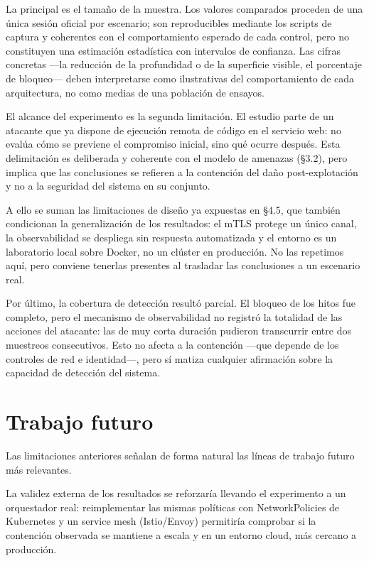 \documentclass[11pt,spanish,listoffigures,listoftables]{tfgetsinf}
\begin{document}
        La principal es el tamaño de la muestra. Los valores comparados proceden de una única sesión oficial por escenario; son reproducibles mediante los scripts de captura y coherentes con el comportamiento esperado de cada control, pero no constituyen una estimación estadística con intervalos de confianza. Las cifras concretas —la reducción de la profundidad o de la superficie visible, el porcentaje de bloqueo— deben interpretarse como ilustrativas del comportamiento de cada arquitectura, no como medias de una población de ensayos.

        El alcance del experimento es la segunda limitación. El estudio parte de un atacante que ya dispone de ejecución remota de código en el servicio web: no evalúa cómo se previene el compromiso inicial, sino qué ocurre después. Esta delimitación es deliberada y coherente con el modelo de amenazas (§3.2), pero implica que las conclusiones se refieren a la contención del daño post-explotación y no a la seguridad del sistema en su conjunto.

        A ello se suman las limitaciones de diseño ya expuestas en §4.5, que también condicionan la generalización de los resultados: el mTLS protege un único canal, la observabilidad se despliega sin respuesta automatizada y el entorno es un laboratorio local sobre Docker, no un clúster en producción. No las repetimos aquí, pero conviene tenerlas presentes al trasladar las conclusiones a un escenario real.

        Por último, la cobertura de detección resultó parcial. El bloqueo de los hitos fue completo, pero el mecanismo de observabilidad no registró la totalidad de las acciones del atacante: las de muy corta duración pudieron transcurrir entre dos muestreos consecutivos. Esto no afecta a la contención —que depende de los controles de red e identidad—, pero sí matiza cualquier afirmación sobre la capacidad de detección del sistema.

        \section{Trabajo futuro}
        Las limitaciones anteriores señalan de forma natural las líneas de trabajo futuro más relevantes.

        La validez externa de los resultados se reforzaría llevando el experimento a un orquestador real: reimplementar las mismas políticas con NetworkPolicies de Kubernetes y un service mesh (Istio/Envoy) permitiría comprobar si la contención observada se mantiene a escala y en un entorno cloud, más cercano a producción.
        
\end{document}
